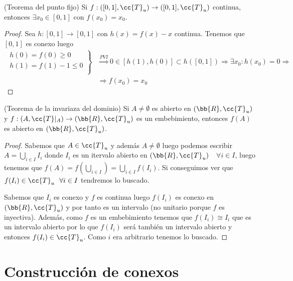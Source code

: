\begin{teo}
    (Teorema del punto fijo) Si $f:([0,1], \cc{T}_u)\to ([0,1], \cc{T}_u)$ continua, entonces $\exists x_0 \in [0,1]$ con $f(x_0)=x_0$.
    \begin{proof}
        Sea $h:[0,1]\to [0,1]$ con $h(x)=f(x)-x$ continua. Tenemos que $[0,1]$ es conexo luego
        \begin{align*}
            \left.
            \begin{array}{c}
                h(0)=f(0)\geq 0\\
                h(1)=f(1)-1 \leq 0\\
            \end{array}
            \right\} &\overset{PVI}{\Rightarrow} 0 \in [h(1),h(0)] \subset h([0,1]) \Rightarrow \exists x_0 : h(x_0)=0 \Rightarrow \\
            &\Rightarrow f(x_0) = x_0
        \end{align*}
    \end{proof}
\end{teo}

\begin{teo}
    (Teorema de la invariaza del dominio) Si $A\neq \emptyset $ es abierto en $(\bb{R}, \cc{T}_u)$ y $f:(A, \cc{T}|_A)\to (\bb{R}, \cc{T}_u)$ es un embebimiento, entonces $f(A)$ es abierto en $(\bb{R}, \cc{T}_u)$.

    \begin{proof}
        Sabemos que $A\in \cc{T}_u$ y además $A\neq \emptyset$ luego podemos escribir $A=\bigcup\limits_{i\in I}I_i$ donde $I_i$ es un itervalo abierto en $(\bb{R}, \cc{T}_u)$\ \ $\forall i \in I$, luego tenemos que $f(A)=f(\bigcup\limits_{i\in I})=\bigcup\limits_{i\in I}f(I_i)$. Si conseguimos ver que $f(I_i)\in \cc{T}_u\ \ \forall i \in I$ tendremos lo buscado. 

        Sabemos que $I_i$ es conexo y $f$ es continua luego $f(I_i)$ es conexo en $(\bb{R}, \cc{T}_u)$ y por tanto es un intervalo (no unitario porque $f$ es inyectiva). Además, como $f$ es un embebimiento tenemos que $f(I_i)\cong I_i$ que es un intervalo abierto por lo que $f(I_i)$ será también un intervalo abierto y entonces $f(I_i)\in \cc{T}_u$. Como $i$ era arbitrario tenemos lo buscado.

    \end{proof}
\end{teo}

 \section{Construcción de conexos}

